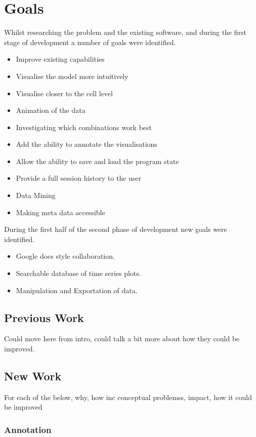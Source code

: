 \section{Goals}

Whilst researching the problem and the existing software, and during the first stage of development a number of goals were identified.

\begin{itemize}
\item Improve existing capabilities
\item Visualise the model more intuitively
\item Visualise closer to the cell level
\item Animation of the data
\item Investigating which combinations work best
\item Add the ability to annotate the visualisations
\item Allow the ability to save and load the program state
\item Provide a full session history to the user
\item Data Mining
\item Making meta data accessible
\end{itemize}

During the first half of the second phase of development new goals were identified.

\begin{itemize}
\item Google docs style collaboration.
\item Searchable database of time series plots.
\item Manipulation and Exportation of data.
\end{itemize}

\subsection{Previous Work}
Could move here from intro, could talk a bit more about how they could be improved.

\subsection{New Work}

For each of the below, why, how inc conceptual problemss, impact, how it could be improved

\subsubsection{Annotation}

